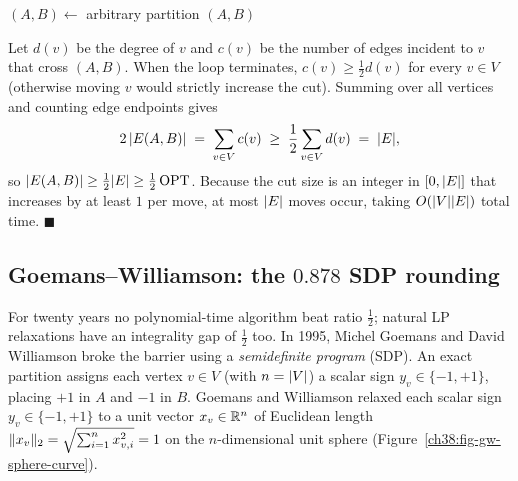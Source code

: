 \begin{algorithm}[H]
\caption{\textsc{LocalMaxCut}$(\Gph)$}\label{ch38:alg-localcut}
\DontPrintSemicolon
$(A,B)\gets$ arbitrary partition\;
\Return $(A,B)$\;
\end{algorithm}

\begin{whybox}
Let $d(v)$ be the degree of $v$ and $c(v)$ be the number of edges incident to $v$ that cross $(A,B)$.
When the loop terminates, $c(v)\ge \tfrac12 d(v)$ for every $v\in V$ (otherwise moving $v$ would strictly
increase the cut). Summing over all vertices and counting edge endpoints gives
\[
  2\,\lvert E(A,B)\rvert \;=\; \sum_{v\in V} c(v) \;\ge\; \frac{1}{2}\sum_{v\in V} d(v) \;=\; \lvert E\rvert,
\]
so $\lvert E(A,B)\rvert \ge \tfrac12\lvert E\rvert \ge \tfrac12\,\mathrm{OPT}$. Because the cut size is an integer in
$[0,\lvert E\rvert]$ that increases by at least $1$ per move, at most $\lvert E\rvert$ moves occur, taking
$O(\lvert V\rvert\lvert E\rvert)$ total time. $\blacksquare$
\end{whybox}

\subsection{Goemans--Williamson: the $0.878$ SDP rounding}

For twenty years no polynomial-time algorithm beat ratio $\tfrac12$; natural LP relaxations have an
integrality gap of $\tfrac12$ too. In 1995, Michel Goemans and David Williamson broke the barrier using
a \emph{semidefinite program} (SDP). An exact partition assigns each vertex $v\in V$ (with $n=\lvert V\rvert$)
a scalar sign $y_v \in \{-1,+1\}$, placing $+1$ in $A$ and $-1$ in $B$. Goemans and Williamson relaxed
each scalar sign $y_v \in \{-1,+1\}$ to a unit vector $x_v \in \mathbb{R}^n$ of Euclidean length
$\lVert x_v\rVert_2 = \sqrt{\sum_{i=1}^n x_{v,i}^2} = 1$ on the $n$-dimensional unit sphere (Figure~\ref{ch38:fig-gw-sphere-curve}).


